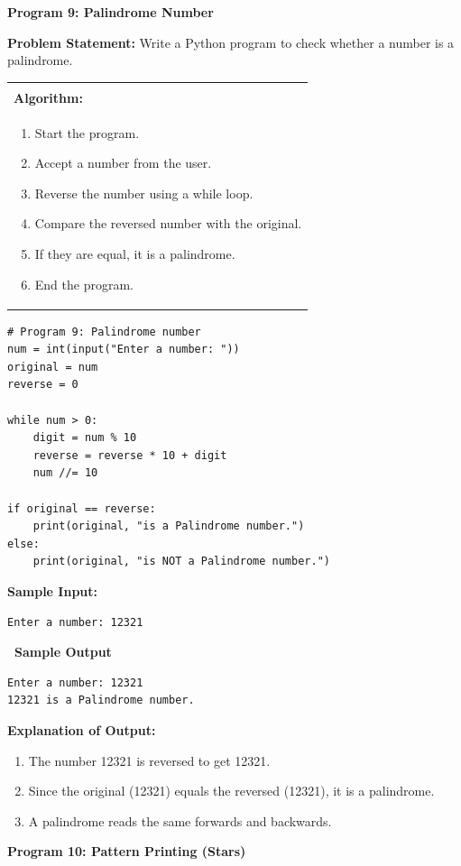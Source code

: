 \documentclass[12pt,a4paper]{article}
\makeatletter
\newcommand{\outhead}{\noindent\colorbox{cmrgreen!25}%
  {\textbf{\small\color{cmrdark}~Sample Output~}}\par\vspace{-1pt}}
\newenvironment{algobox}{%
  \par\vspace{4pt}%
  \noindent\begin{tabular}{@{}p{\linewidth}@{}}%
  \hline\\[-8pt]%
  \textbf{\color{blue!60!black}\small Algorithm:}\\[2pt]%
}{%
  \\[-4pt]\hline%
  \end{tabular}\par\vspace{4pt}%
}
\makeatother
\begin{document}
\textbf{Program 9: Palindrome Number}

\textbf{Problem Statement:}
Write a Python program to check whether a number is a palindrome.

\begin{algobox}
\begin{enumerate}[label=Step \arabic*:]
  \item Start the program.
  \item Accept a number from the user.
  \item Reverse the number using a while loop.
  \item Compare the reversed number with the original.
  \item If they are equal, it is a palindrome.
  \item End the program.
\end{enumerate}
\end{algobox}

\begin{lstlisting}
# Program 9: Palindrome number
num = int(input("Enter a number: "))
original = num
reverse = 0

while num > 0:
    digit = num % 10
    reverse = reverse * 10 + digit
    num //= 10

if original == reverse:
    print(original, "is a Palindrome number.")
else:
    print(original, "is NOT a Palindrome number.")
\end{lstlisting}

\textbf{Sample Input:}
\begin{verbatim}
Enter a number: 12321
\end{verbatim}

\outhead
\begin{lstlisting}[style=outputstyle]
Enter a number: 12321
12321 is a Palindrome number.
\end{lstlisting}

\textbf{Explanation of Output:}
\begin{enumerate}
  \item The number 12321 is reversed to get 12321.
  \item Since the original (12321) equals the reversed (12321), it is a palindrome.
  \item A palindrome reads the same forwards and backwards.
\end{enumerate}

\vspace{0.5cm}

\textbf{Program 10: Pattern Printing (Stars)}
\end{document}
